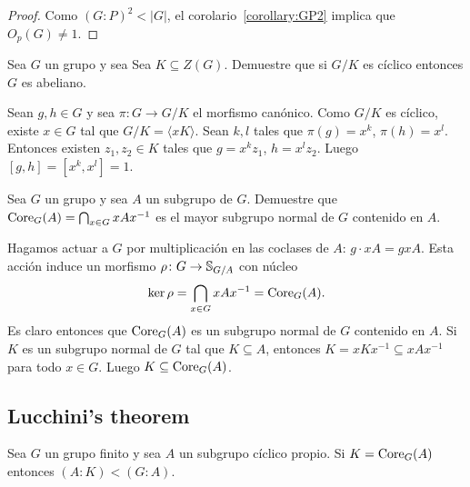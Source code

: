 \begin{proof}
	Como $(G:P)^2<|G|$, el corolario~\ref{corollary:GP2} implica que
	$O_p(G)\ne1$.
\end{proof}

\begin{exercise}
	\label{exercise:G/Z(G)}
	Sea $G$ un grupo y sea Sea $K\subseteq Z(G)$. Demuestre que si $G/K$ es
	cíclico entonces $G$ es abeliano.
\end{exercise}

\begin{svgraybox}
	Sean $g,h\in G$ y sea $\pi\colon G\to G/K$ el morfismo canónico. Como $G/K$
	es cíclico, existe $x\in G$ tal que $G/K=\langle xK\rangle$. Sean $k,l$ tales que 
	$\pi(g)=x^k$, $\pi(h)=x^l$. Entonces existen $z_1,z_2\in K$ tales que 
	$g=x^kz_1$, $h=x^lz_2$. Luego $[g,h]=[x^k,x^l]=1$. 
\end{svgraybox}

\begin{exercise}
	Sea $G$ un grupo y sea $A$ un subgrupo de $G$.  Demuestre que
	$\operatorname{Core}_{G}(A)=\bigcap_{x\in G}xAx^{-1}$ es el mayor subgrupo normal de $G$
	contenido en $A$.
\end{exercise}

\begin{svgraybox}
	Hagamos actuar a $G$ por multiplicación en las coclases de $A$: $g\cdot
	xA=gxA$. Esta acción induce un morfismo $\rho\colon G\to \mathbb{S}_{G/A}$ con
	núcleo
	\[
		\ker\rho=\bigcap_{x\in G}xAx^{-1}=\operatorname{Core}_G(A).
	\]
	Es claro entonces que $\operatorname{Core}_G(A)$ es un subgrupo normal de $G$ contenido
	en $A$. Si $K$ es un subgrupo normal de $G$ tal que $K\subseteq A$,
	entonces $K=xKx^{-1}\subseteq xAx^{-1}$ para todo $x\in G$. Luego
	$K\subseteq\operatorname{Core}_G(A)$.
\end{svgraybox}

\subsection{Lucchini's theorem}

\begin{theorem}[Lucchini]
	\label{theorem:Lucchini}
	Sea $G$ un grupo finito y sea $A$ un subgrupo cíclico propio. Si
	$K=\operatorname{Core}_G(A)$ entonces $(A:K)<(G:A)$.
\end{theorem}

